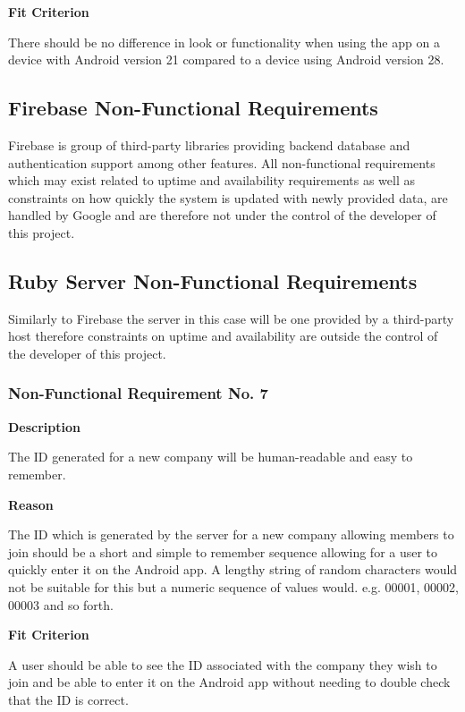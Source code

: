 \textbf{Fit Criterion}

There should be no difference in look or functionality when using the app on a device with Android version 21 compared to a device using Android version 28.

\subsection{Firebase Non-Functional Requirements}

Firebase is group of third-party libraries providing backend database and authentication support among other features. All non-functional requirements which may exist related to uptime and availability requirements as well as constraints on how quickly the system is updated with newly provided data, are handled by Google and are therefore not under the control of the developer of this project.

\subsection{Ruby Server Non-Functional Requirements}

Similarly to Firebase the server in this case will be one provided by a third-party host therefore constraints on uptime and availability are outside the control of the developer of this project. 

\subsubsection{Non-Functional Requirement No. 7}

\textbf{Description}

The ID generated for a new company will be human-readable and easy to remember.

\textbf{Reason}

The ID which is generated by the server for a new company allowing members to join should be a short and simple to remember sequence allowing for a user to quickly enter it on the Android app. A lengthy string of random characters would not be suitable for this but a numeric sequence of values would. e.g. 00001, 00002, 00003 and so forth.

\textbf{Fit Criterion}

A user should be able to see the ID associated with the company they wish to join and be able to enter it on the Android app without needing to double check that the ID is correct.